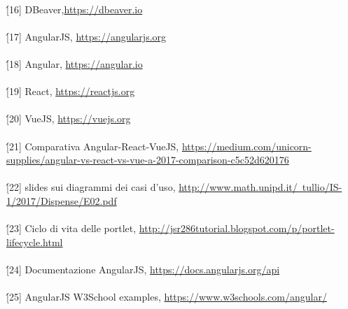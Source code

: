 \\
\'[16] DBeaver,\href{https://dbeaver.io/}{https://dbeaver.io}\\
\\
\'[17] AngularJS, \href{https://angularjs.org/}{https://angularjs.org}\\
\\
\'[18] Angular, \href{https://angular.io}{https://angular.io}\\
\\
\'[19] React, \href{https://reactjs.org}{https://reactjs.org}\\
\\
\'[20] VueJS, \href{https://vuejs.org/}{https://vuejs.org}\\
\\
\'[21] Comparativa Angular-React-VueJS, \href{https://medium.com/unicorn-supplies/angular-vs-react-vs-vue-a-2017-comparison-c5c52d620176}{https://medium.com/unicorn-supplies/angular-vs-react-vs-vue-a-2017-comparison-c5c52d620176}\\
\\
\'[22] slides sui diagrammi dei casi d'uso, \href{http://www.math.unipd.it/~tullio/IS-1/2017/Dispense/E02.pdf}{http://www.math.unipd.it/~tullio/IS-1/2017/Dispense/E02.pdf}\\
\\
\'[23] Ciclo di vita delle portlet, \href{http://jsr286tutorial.blogspot.com/p/portlet-lifecycle.html}{http://jsr286tutorial.blogspot.com/p/portlet-lifecycle.html}\\
\\
\'[24] Documentazione AngularJS, \href{https://docs.angularjs.org/api}{https://docs.angularjs.org/api}\\
\\
\'[25] AngularJS W3School examples, \href{https://www.w3schools.com/angular/}{https://www.w3schools.com/angular/}\\
\newpage
